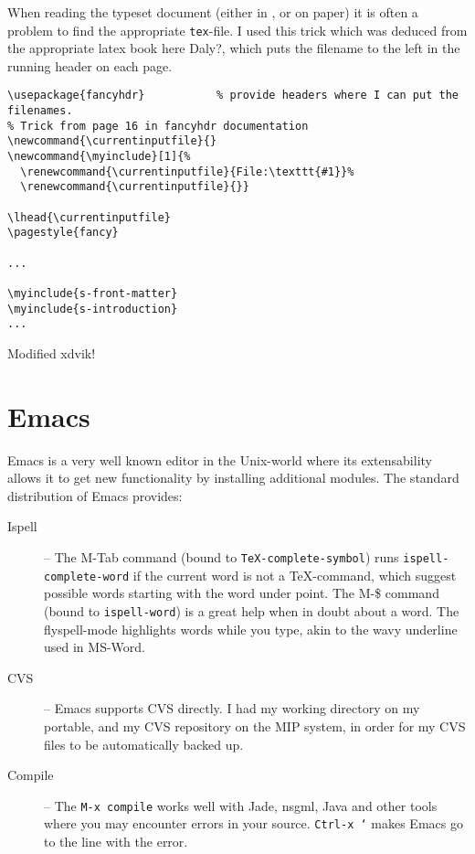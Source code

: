 When reading the typeset document (either in ,
 or on paper) it is often a problem to find the
appropriate \texttt{tex}-file.  I used this trick which was deduced
from the \textsf{appropriate latex book here Daly?}, which puts the
filename to the left in the running header on each page.

\begin{verbatim}
\usepackage{fancyhdr}           % provide headers where I can put the filenames.
% Trick from page 16 in fancyhdr documentation
\newcommand{\currentinputfile}{}
\newcommand{\myinclude}[1]{%
  \renewcommand{\currentinputfile}{File:\texttt{#1}}%
  \renewcommand{\currentinputfile}{}}

\lhead{\currentinputfile}
\pagestyle{fancy}

...

\myinclude{s-front-matter}
\myinclude{s-introduction}
...
\end{verbatim}

\textsf{Modified xdvik}!

\section{Emacs} 
\label{sec:report-writing-tools-emacs} 


Emacs is a very well known editor in the Unix-world where its
extensability allows it to get new functionality by installing
additional modules.  The standard distribution of Emacs provides:

\begin{description}
\item[Ispell] -- The M-Tab command (bound to
  \texttt{TeX-complete-symbol}) runs \texttt{ispell-complete-word} if
  the current word is not a {\TeX}-command, which suggest possible
  words starting with the word under point.  The M-\$ command (bound
  to \texttt{ispell-word}) is a great help when in doubt about a
  word.  The \textsf{flyspell-mode} highlights words while you type,
  akin to the wavy underline used in MS-Word. 

\item[CVS] -- Emacs supports CVS directly.  I
  had my working directory on my portable, and my CVS repository on
  the MIP system, in order for my CVS files to be automatically backed
  up. 
\item[Compile] -- The \texttt{M-x compile} works well with Jade,
  nsgml, Java and other tools where you may encounter errors in your
  source.  \texttt{Ctrl-x `} makes Emacs go to the line with the
  error.
  
\end{description}

